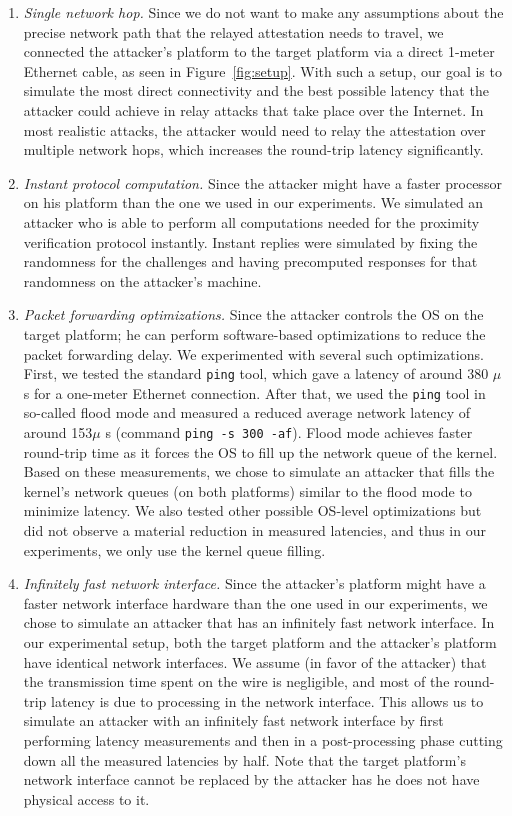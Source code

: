 \begin{enumerate}
	\item \emph{Single network hop.} Since we do not want to make any assumptions about the precise network path that the relayed attestation needs to travel, we connected the attacker's platform to the target platform via a direct 1-meter Ethernet cable, as seen in Figure~\ref{fig:setup}. With such a setup, our goal is to simulate the most direct connectivity and the best possible latency that the attacker could achieve in relay attacks that take place over the Internet. In most realistic attacks, the attacker would need to relay the attestation over multiple network hops, which increases the round-trip latency significantly. 

	\item \emph{Instant protocol computation.} Since the attacker might have a faster processor on his platform than the one we used in our experiments. We simulated an attacker who is able to perform all computations needed for the proximity verification protocol instantly. Instant replies were simulated by fixing the randomness for the challenges and having precomputed responses for that randomness on the attacker's machine.

	\item \emph{Packet forwarding optimizations.} Since the attacker controls the OS on the target platform; he can perform software-based optimizations to reduce the packet forwarding delay. We experimented with several such optimizations. First, we tested the standard \texttt{ping} tool, which gave a latency of around 380 $\mu$s for a one-meter Ethernet connection. After that, we used the \texttt{ping} tool in so-called flood mode and measured a reduced average network latency of around 153$\mu$ s (command \texttt{ping -s 300 -af}). Flood mode achieves faster round-trip time as it forces the OS to fill up the network queue of the kernel. Based on these measurements, we chose to simulate an attacker that fills the kernel's network queues (on both platforms) similar to the flood mode to minimize latency. We also tested other possible OS-level optimizations but did not observe a material reduction in measured latencies, and thus in our experiments, we only use the kernel queue filling.
	
	\item \emph{Infinitely fast network interface.} Since the attacker's platform might have a faster network interface hardware than the one used in our experiments, we chose to simulate an attacker that has an infinitely fast network interface. In our experimental setup, both the target platform and the attacker's platform have identical network interfaces. We assume (in favor of the attacker) that the transmission time spent on the wire is negligible, and most of the round-trip latency is due to processing in the network interface. This allows us to simulate an attacker with an infinitely fast network interface by first performing latency measurements and then in a post-processing phase cutting down all the measured latencies by half. Note that the target platform's network interface cannot be replaced by the attacker has he does not have physical access to it.
\end{enumerate}

